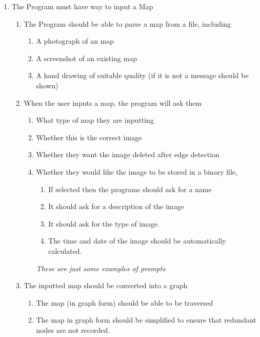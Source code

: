 \begin{FlushLeft}
        \begin{enumerate}
            \item The Program must have way to input a Map
            \begin{enumerate}
                \item The Program should be able to parse a map from a file, including
                \begin{enumerate}
                    \item A photograph of an map
                    \item A screenshot of an existing map
                    \item A hand drawing of suitable quality (if it is not a message should be shown)
                \end{enumerate}
                \item When the user inputs a map, the program will ask them
                \begin{enumerate}
                    \item What type of map they are inputting
                    \item Whether this is the correct image
                    \item Whether they want the image deleted after edge detection
                    \item Whether they would like the image to be stored in a binary file, \\
                    \begin{enumerate}
                        \item If selected then the programs should ask for a name
                        \item It should ask for a description of the image
                        \item It should ask for the type of image.
                        \item The time and date of the image should be automatically calculated.
                    \end{enumerate}
                    \emph{These are just some examples of prompts}
                \end{enumerate}
                \item The inputted map should be converted into a graph
                \begin{enumerate}
                    \item The map (in graph form) should be able to be traversed
                    \item The map in graph form should be simplified to ensure that redundant nodes are not recorded.
                \end{enumerate}
                

\end{enumerate}
\end{enumerate}
\end{FlushLeft}
